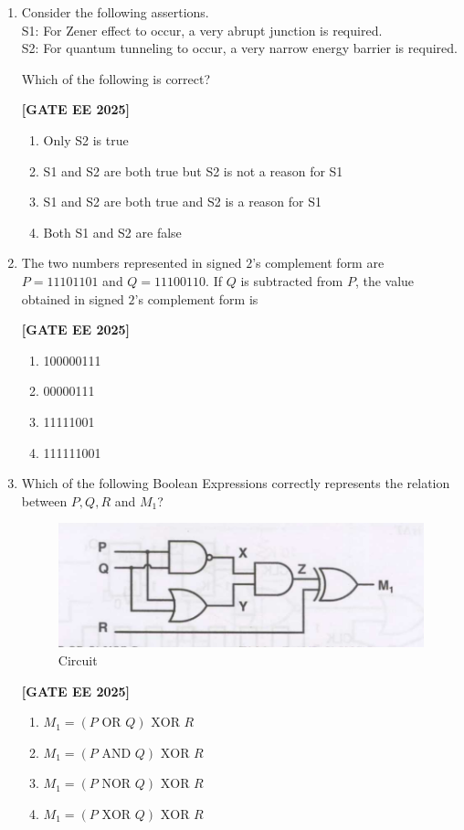 \documentclass[12pt]{article}
\begin{document}
\begin{enumerate}[leftmargin=*, label=\textbf{Q.\arabic*:}]
\item Consider the following assertions. \\
S1: For Zener effect to occur, a very abrupt junction is required. \\
S2: For quantum tunneling to occur, a very narrow energy barrier is required.

Which of the following is correct?
 
\noindent \textbf{[GATE EE 2025]}
\begin{enumerate}
    \item Only S2 is true
    \item S1 and S2 are both true but S2 is not a reason for S1
    \item S1 and S2 are both true and S2 is a reason for S1
    \item Both S1 and S2 are false
\end{enumerate}

\item The two numbers represented in signed $2$'s complement form are \\
$P=11101101$ and $Q=11100110$. If $Q$ is subtracted from $P$, the value obtained in signed $2$'s complement form is
 
\noindent \textbf{[GATE EE 2025]}
\begin{enumerate}
    \item 100000111
    \item 00000111
    \item 11111001
    \item 111111001
\end{enumerate}

\item Which of the following Boolean Expressions correctly represents the relation between $P, Q, R$ and $M_1$?
\begin{figure}[H]\centering
\includegraphics[width=0.6\columnwidth]{figs/q57.png}
\caption{Circuit}
\label{fig:q57}
\end{figure}
 
\noindent \textbf{[GATE EE 2025]}
\begin{enumerate}
  \item $M_1 = (P \text{ OR } Q) \text{ XOR } R$
  \item $M_1 = (P \text{ AND } Q) \text{ XOR } R$
  \item $M_1 = (P \text{ NOR } Q) \text{ XOR } R$
  \item $M_1 = (P \text{ XOR } Q) \text{ XOR } R$
\end{enumerate}


\end{enumerate}
\end{document}
